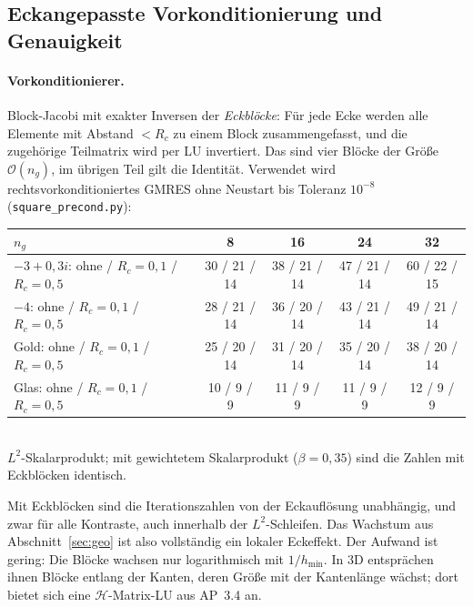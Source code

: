 \documentclass[11pt, a4paper]{article}
\theoremstyle{plain}
\theoremstyle{definition}
\begin{document}
\subsection{Eckangepasste Vorkonditionierung und Genauigkeit}\label{sec:vorkond}

\paragraph{Vorkonditionierer.} Block-Jacobi mit exakter Inversen der
\emph{Eckblöcke}: Für jede Ecke werden alle Elemente mit Abstand $<R_c$ zu einem
Block zusammengefasst, und die zugehörige Teilmatrix wird per LU invertiert. Das sind
vier Blöcke der Größe $\mathcal{O}(n_g)$, im übrigen Teil gilt die Identität.
Verwendet wird rechtsvorkonditioniertes GMRES ohne Neustart bis Toleranz $10^{-8}$
(\texttt{square\_precond.py}):
\begin{center}\small
\begin{tabular}{lcccc}
\toprule
$n_g$ & 8 & 16 & 24 & 32\\
\midrule
$-3+0{,}3i$: ohne / $R_c=0{,}1$ / $R_c=0{,}5$ & 30 / 21 / 14 & 38 / 21 / 14 & 47 / 21 / 14 & 60 / 22 / 15\\
$-4$: ohne / $R_c=0{,}1$ / $R_c=0{,}5$ & 28 / 21 / 14 & 36 / 20 / 14 & 43 / 21 / 14 & 49 / 21 / 14\\
Gold: ohne / $R_c=0{,}1$ / $R_c=0{,}5$ & 25 / 20 / 14 & 31 / 20 / 14 & 35 / 20 / 14 & 38 / 20 / 14\\
Glas: ohne / $R_c=0{,}1$ / $R_c=0{,}5$ & 10 / 9 / 9 & 11 / 9 / 9 & 11 / 9 / 9 & 12 / 9 / 9\\
\bottomrule
\end{tabular}\\[2pt]
{\footnotesize $L^2$-Skalarprodukt; mit gewichtetem Skalarprodukt ($\beta=0{,}35$) sind
die Zahlen mit Eckblöcken identisch.}
\end{center}
Mit Eckblöcken sind die Iterationszahlen von der Eckauflösung unabhängig, und zwar
für alle Kontraste, auch innerhalb der $L^2$-Schleifen. Das Wachstum aus
Abschnitt~\ref{sec:geo} ist also vollständig ein lokaler Eckeffekt. Der Aufwand ist
gering: Die Blöcke wachsen nur logarithmisch mit $1/h_{\min}$. In 3D entsprächen
ihnen Blöcke entlang der Kanten, deren Größe mit der Kantenlänge wächst; dort
bietet sich eine $\mathcal{H}$-Matrix-LU aus AP~3.4 an.
\end{document}
